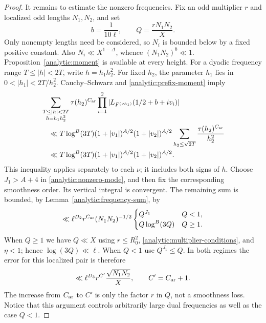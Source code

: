\begin{proof}
It remains to estimate the nonzero frequencies. Fix an odd multiplier
$r$ and localized odd lengths $N_1,N_2$, and set
\[
 b=\frac1{10\ell},\qquad Q=\frac{rN_1N_2}{X}.
\]
Only nonempty lengths need be considered, so $N_i$ is bounded below
by a fixed positive constant. Also $N_i\ll X^{1-\Delta}$, whence
$(N_1N_2)^b\ll1$. Proposition~\ref{analytic:moment} is available
at every height. For a dyadic frequency range $T\leq|h|<2T$,
write $h=h_1h_2^2$. For fixed $h_2$, the parameter $h_1$ lies in
$0<|h_1|<2T/h_2^2$. Cauchy--Schwarz and
\eqref{analytic:prefix-moment} imply
\begin{align*}
 &\sum_{\substack{T\leq|h|<2T\\h=h_1h_2^2}}
 \tau(h_2)^{C_{\rm ar}}
 \prod_{i=1}^2
 |L_{F^{(\nu h_1)}}(1/2+b+iv_i)|\\
 &\quad\ll
 T\log^B(3T)(1+|v_1|)^{A/2}(1+|v_2|)^{A/2}
 \sum_{h_2\leq\sqrt{2T}}\frac{\tau(h_2)^{C_{\rm ar}}}{h_2^2}\\
 &\quad\ll T\log^B(3T)
               (1+|v_1|)^{A/2}(1+|v_2|)^{A/2}.
\end{align*}
This inequality applies separately to each $\nu$; it includes both
signs of $h$. Choose $J_1>A+4$ in
\eqref{analytic:nonzero-mode}, and then fix the corresponding
smoothness order. Its vertical integral is convergent. The remaining
sum is bounded, by Lemma~\ref{analytic:frequency-sum}, by
\[
 \ll \ell^{D_2}r^{C_{\rm ar}}(N_1N_2)^{-1/2}
 \begin{cases}Q^{J_1}&Q<1,\\Q\log^B(3Q)&Q\geq1.
 \end{cases}
\]
When $Q\geq1$ we have $Q\ll X$ using $r\leq R_0^2$,
\eqref{analytic:multiplier-conditions}, and $\eta<1$; hence
$\log(3Q)\ll\ell$. When $Q<1$ use $Q^{J_1}\leq Q$.
In both regimes the error for this localized pair is therefore
\begin{equation}\label{analytic:localized-comparison-error}
 \ll\ell^{D_3}r^{C'}\frac{\sqrt{N_1N_2}}X,
 \qquad C'=C_{\rm ar}+1.
\end{equation}
The increase from $C_{\rm ar}$ to $C'$ is only the factor $r$
in $Q$, not a smoothness loss. Notice that this argument controls
arbitrarily large dual frequencies as well as the case $Q<1$.


\end{proof}
